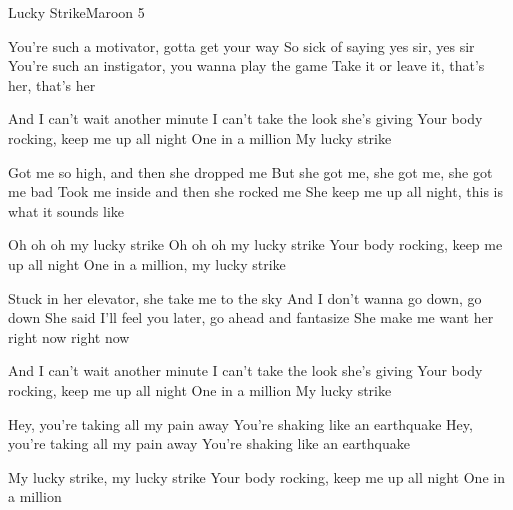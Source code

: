 \documentclass[a4paper,11pt,french]{article}
\begin{document}
\begin{Song}{Lucky Strike}{Maroon 5}
\begin{multicols}{2}

\begin{Verse}
You're such a motivator, gotta get your way
So sick of saying yes sir, yes sir
You're such an instigator, you wanna play the game
Take it or leave it, that's her, that's her
\end{Verse}
\espaceInterStrophe

\begin{PreChorus}
And I can't wait another minute
I can't take the look she's giving
Your body rocking, keep me up all night
One in a million
My lucky strike
\end{PreChorus}
\espaceInterStrophe

\begin{Chorus}
Got me so high, and then she dropped me
But she got me, she got me, she got me bad
Took me inside and then she rocked me
She keep me up all night, this is what it sounds like
\espaceInterStrophe

Oh oh oh my lucky strike
Oh oh oh my lucky strike
Your body rocking, keep me up all night
One in a million, my lucky strike
\end{Chorus}
\vfill
\columnbreak

\begin{Verse}
Stuck in her elevator, she take me to the sky
And I don't wanna go down, go down
She said I'll feel you later, go ahead and fantasize
She make me want her right now right now
\end{Verse}
\espaceInterStrophe

\begin{PreChorus}
And I can't wait another minute
I can't take the look she's giving
Your body rocking, keep me up all night
One in a million
My lucky strike
\end{PreChorus}
\espaceInterStrophe

\tochorus
\espaceInterStrophe

\begin{Bridge}
Hey, you're taking all my pain away
You're shaking like an earthquake
Hey, you're taking all my pain away
You're shaking like an earthquake
\end{Bridge}
\espaceInterStrophe

\tochorus
\espaceInterStrophe

\begin{Chorus}
My lucky strike, my lucky strike
Your body rocking, keep me up all night
One in a million
\end{Chorus}
\espaceInterStrophe


\end{multicols}
\end{Song}
\end{document}
